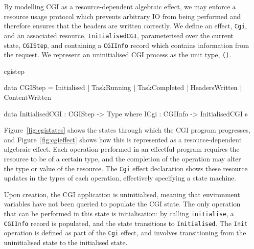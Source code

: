 
By modelling CGI as a resource-dependent algebraic effect, we may enforce a
resource usage protocol which
prevents arbitrary IO from being performed and therefore
ensures that the headers are written correctly. We
define an effect, \texttt{Cgi}, and an associated resource,
\texttt{InitialisedCGI}, parameterised over the current state,
\texttt{CGIStep}, and containing a
\texttt{CGIInfo} record which contains information from the request. We
represent an uninitialised CGI process as the unit type, \texttt{()}.

\begin{SaveVerbatim}{cgistep}

data CGIStep = Initialised   | TaskRunning 
             | TaskCompleted | HeadersWritten 
             | ContentWritten

data InitialisedCGI : CGIStep -> Type where
     ICgi : CGIInfo -> InitialisedCGI s

\end{SaveVerbatim}

\noindent
Figure~\ref{fig:cgistates} shows the states through which the CGI program
progresses, and Figure~\ref{fig:cgieffect} shows how this is represented
as a resource-dependent algebraic effect. Each operation performed in an effectful
program requires the resource to be of a certain type, and the completion of
the operation may alter the type or value of the resource. The \texttt{Cgi}
effect declaration shows these resource updates in the types of each operation,
effectively specifying a state machine.

Upon creation, the CGI application is uninitialised, meaning that environment variables have not been queried to populate the CGI state. The only operation
that can be performed in this state is initialisation: by calling
\texttt{initialise}, a \texttt{CGIInfo} record is populated, and the state transitions
to \texttt{Initialised}. The \texttt{Init} operation is defined as part of the
\texttt{Cgi} effect, and involves transitioning from the uninitialised state to
the initialised state.

